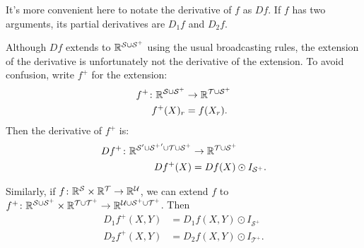 It's more convenient here to notate the derivative of $f$ as $Df$. If $f$ has two arguments, its partial derivatives are $D_1 f$ and $D_2 f$.

Although $Df$ extends to $\mathbb{R}^{\mathcal{S} \cup \mathcal{S^+}}$ using the usual broadcasting rules, the extension of the derivative is unfortunately not the derivative of the extension. To avoid confusion, write $f^+$ for the extension:
\begin{align*}
  f^+ \colon \mathbb{R}^{\mathcal{S} \cup \mathcal{S^+}} &\rightarrow \mathbb{R}^{\mathcal{T} \cup \mathcal{S^+}} \\
  f^+(X)_r &= f(X_r).
\end{align*}
Then the derivative of $f^+$ is:
\begin{align*}
  Df^+ \colon \mathbb{R}^{\mathcal{S'} \cup \mathcal{{S^+}'} \cup \mathcal{T} \cup \mathcal{S^+}} &\rightarrow \mathbb{R}^{\mathcal{T} \cup \mathcal{S^+}} \\
  Df^+(X) &= Df(X) \odot I_{\mathcal{S}^+}.
\end{align*}  

Similarly, if $f \colon \mathbb{R}^\mathcal{S} \times \mathbb{R}^\mathcal{T} \rightarrow \mathbb{R}^\mathcal{U}$, we can extend $f$ to $f^+ \colon \mathbb{R}^\mathcal{S \cup S^+} \times \mathbb{R}^\mathcal{T \cup T^+} \rightarrow \mathbb{R}^\mathcal{U \cup S^+ \cup T^+}$. Then
\begin{align*}
  D_1 f^+(X, Y) &= D_1 f(X, Y) \odot I_{\mathcal{S}^+} \\
  D_2 f^+(X, Y) &= D_2 f(X, Y) \odot I_{\mathcal{T}^+}.
\end{align*}

